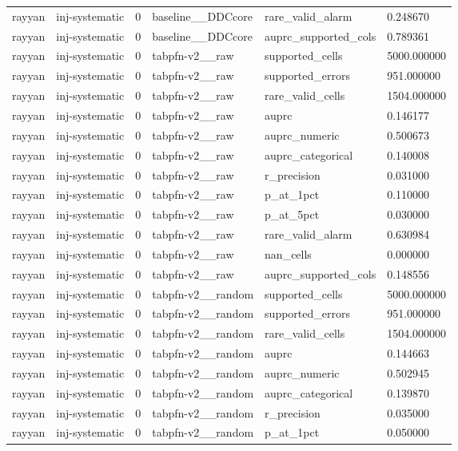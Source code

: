 \begin{tabular}{llllll}
rayyan & inj-systematic & 0 & baseline\_\_DDCcore & rare\_valid\_alarm & 0.248670 \\
rayyan & inj-systematic & 0 & baseline\_\_DDCcore & auprc\_supported\_cols & 0.789361 \\
rayyan & inj-systematic & 0 & tabpfn-v2\_\_raw & supported\_cells & 5000.000000 \\
rayyan & inj-systematic & 0 & tabpfn-v2\_\_raw & supported\_errors & 951.000000 \\
rayyan & inj-systematic & 0 & tabpfn-v2\_\_raw & rare\_valid\_cells & 1504.000000 \\
rayyan & inj-systematic & 0 & tabpfn-v2\_\_raw & auprc & 0.146177 \\
rayyan & inj-systematic & 0 & tabpfn-v2\_\_raw & auprc\_numeric & 0.500673 \\
rayyan & inj-systematic & 0 & tabpfn-v2\_\_raw & auprc\_categorical & 0.140008 \\
rayyan & inj-systematic & 0 & tabpfn-v2\_\_raw & r\_precision & 0.031000 \\
rayyan & inj-systematic & 0 & tabpfn-v2\_\_raw & p\_at\_1pct & 0.110000 \\
rayyan & inj-systematic & 0 & tabpfn-v2\_\_raw & p\_at\_5pct & 0.030000 \\
rayyan & inj-systematic & 0 & tabpfn-v2\_\_raw & rare\_valid\_alarm & 0.630984 \\
rayyan & inj-systematic & 0 & tabpfn-v2\_\_raw & nan\_cells & 0.000000 \\
rayyan & inj-systematic & 0 & tabpfn-v2\_\_raw & auprc\_supported\_cols & 0.148556 \\
rayyan & inj-systematic & 0 & tabpfn-v2\_\_random & supported\_cells & 5000.000000 \\
rayyan & inj-systematic & 0 & tabpfn-v2\_\_random & supported\_errors & 951.000000 \\
rayyan & inj-systematic & 0 & tabpfn-v2\_\_random & rare\_valid\_cells & 1504.000000 \\
rayyan & inj-systematic & 0 & tabpfn-v2\_\_random & auprc & 0.144663 \\
rayyan & inj-systematic & 0 & tabpfn-v2\_\_random & auprc\_numeric & 0.502945 \\
rayyan & inj-systematic & 0 & tabpfn-v2\_\_random & auprc\_categorical & 0.139870 \\
rayyan & inj-systematic & 0 & tabpfn-v2\_\_random & r\_precision & 0.035000 \\
rayyan & inj-systematic & 0 & tabpfn-v2\_\_random & p\_at\_1pct & 0.050000 \\

\end{tabular}
